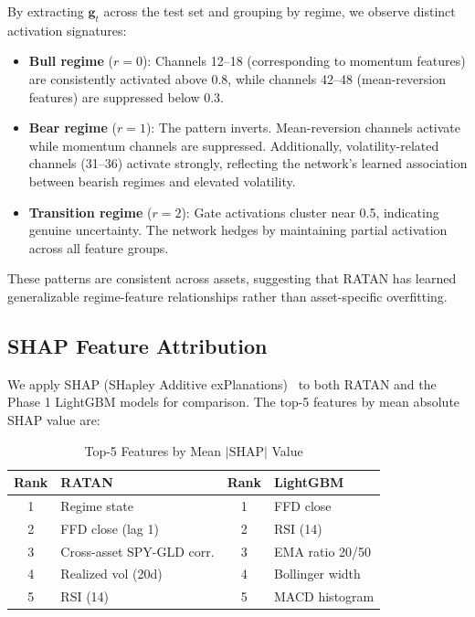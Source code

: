 \documentclass[conference]{IEEEtran}
\begin{document}
By extracting $\mathbf{g}_t$ across the test set and grouping by regime, we observe distinct activation signatures:
\begin{itemize}[leftmargin=*]
    \item \textbf{Bull regime} ($r=0$): Channels 12--18 (corresponding to momentum features) are consistently activated above 0.8, while channels 42--48 (mean-reversion features) are suppressed below 0.3.
    \item \textbf{Bear regime} ($r=1$): The pattern inverts. Mean-reversion channels activate while momentum channels are suppressed. Additionally, volatility-related channels (31--36) activate strongly, reflecting the network's learned association between bearish regimes and elevated volatility.
    \item \textbf{Transition regime} ($r=2$): Gate activations cluster near 0.5, indicating genuine uncertainty. The network hedges by maintaining partial activation across all feature groups.
\end{itemize}

These patterns are consistent across assets, suggesting that RATAN has learned generalizable regime-feature relationships rather than asset-specific overfitting.

\subsection{SHAP Feature Attribution}

We apply SHAP (SHapley Additive exPlanations)~\cite{lundberg2017unified} to both RATAN and the Phase 1 LightGBM models for comparison. The top-5 features by mean absolute SHAP value are:

\begin{table}[ht]
\centering
\caption{Top-5 Features by Mean $|\text{SHAP}|$ Value}
\label{tab:shap}
\begin{tabular}{@{}clcl@{}}
\toprule
\textbf{Rank} & \textbf{RATAN} & \textbf{Rank} & \textbf{LightGBM} \\
\midrule
1 & Regime state & 1 & FFD close \\
2 & FFD close (lag 1) & 2 & RSI (14) \\
3 & Cross-asset SPY-GLD corr. & 3 & EMA ratio 20/50 \\
4 & Realized vol (20d) & 4 & Bollinger width \\
5 & RSI (14) & 5 & MACD histogram \\
\bottomrule
\end{tabular}
\end{table}
\end{document}
